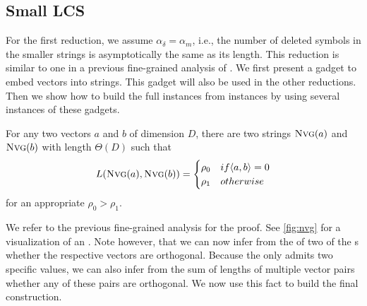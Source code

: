 \subsection{Small LCS}
For the first reduction, we assume $\alpha_\delta = \alpha_m$, i.e., the number of deleted symbols in the smaller strings is asymptotically the same as its length.
This reduction is similar to one in a previous fine-grained analysis of \lcs{} \cite{Bringmann.2015}.
We first present a gadget to embed vectors into strings.
This gadget will also be used in the other reductions.
Then we show how to build the full \lcs{} instances from \ov{} instances by using several instances of these gadgets.



\begin{theorem}
For any two vectors $a$ and $b$ of dimension $D$, there are two strings $\text{\textsc{Nvg}}(a)$ and $\text{\textsc{Nvg}}(b)$ with length $\Theta(D)$ such that
\[
L(\text{\textsc{Nvg}}(a), \text{\textsc{Nvg}}(b)) = \begin{cases}
		\rho_0 & if \langle a, b \rangle = 0\\
		\rho_1 & otherwise
	\end{cases}
\]
for an appropriate $\rho_0 > \rho_1$.
\end{theorem}



We refer to the previous fine-grained analysis \cite{Bringmann.2015} for the proof.
See \autoref{fig:nvg} for a visualization of an \nvgName{}.
Note however, that we can now infer from the \lcs{} of two of the \nvgName{}s whether the respective vectors are orthogonal.
Because the \lcs{} only admits two specific values, we can also infer from the sum of \lcs{} lengths of multiple vector pairs whether any of these pairs are orthogonal.
We now use this fact to build the final construction.



